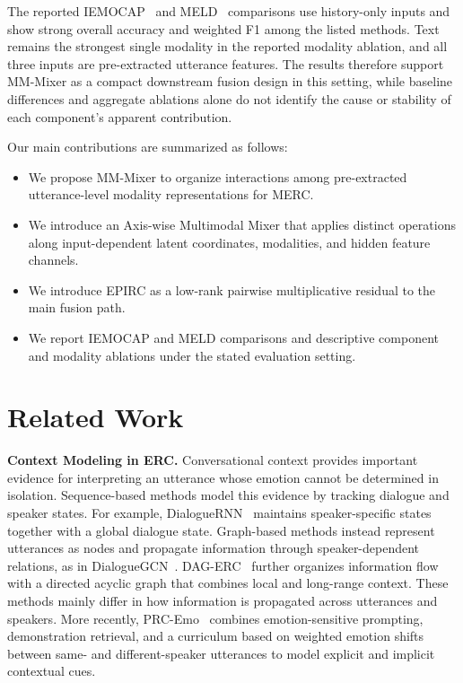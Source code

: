 \documentclass[letterpaper]{article} %
\begin{document}
The reported IEMOCAP~\cite{iemocap} and MELD~\cite{meld} comparisons use history-only inputs and show strong overall accuracy and weighted F1 among the listed methods. Text remains the strongest single modality in the reported modality ablation, and all three inputs are pre-extracted utterance features. The results therefore support MM-Mixer as a compact downstream fusion design in this setting, while baseline differences and aggregate ablations alone do not identify the cause or stability of each component's apparent contribution.

Our main contributions are summarized as follows:
\begin{itemize}
\item We propose MM-Mixer to organize interactions among pre-extracted utterance-level modality representations for MERC.
\item We introduce an Axis-wise Multimodal Mixer that applies distinct operations along input-dependent latent coordinates, modalities, and hidden feature channels.
\item We introduce EPIRC as a low-rank pairwise multiplicative residual to the main fusion path.
\item We report IEMOCAP and MELD comparisons and descriptive component and modality ablations under the stated evaluation setting.
\end{itemize}
\section{Related Work}

\noindent\textbf{Context Modeling in ERC.}
Conversational context provides important evidence for interpreting an utterance whose emotion cannot be determined in isolation. Sequence-based methods model this evidence by tracking dialogue and speaker states. For example, DialogueRNN~\cite{dialoguernn} maintains speaker-specific states together with a global dialogue state. Graph-based methods instead represent utterances as nodes and propagate information through speaker-dependent relations, as in DialogueGCN~\cite{dialoguegcn}. DAG-ERC~\cite{dagerc} further organizes information flow with a directed acyclic graph that combines local and long-range context. These methods mainly differ in how information is propagated across utterances and speakers. More recently, PRC-Emo~\cite{prcemo} combines emotion-sensitive prompting, demonstration retrieval, and a curriculum based on weighted emotion shifts between same- and different-speaker utterances to model explicit and implicit contextual cues.
\end{document}
